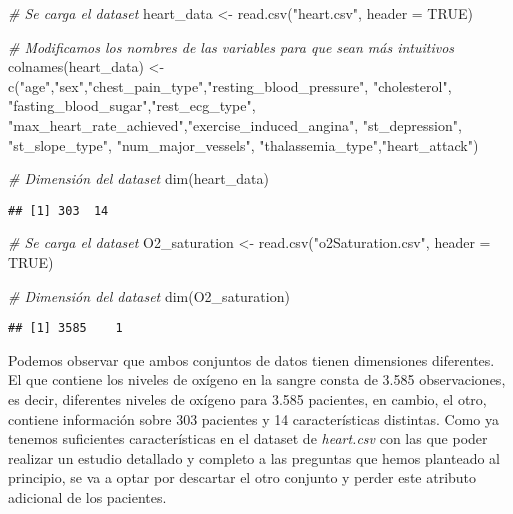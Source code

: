 \documentclass[
]{article}
\newenvironment{Shaded}{\begin{snugshade}}{\end{snugshade}}
\newcommand{\AttributeTok}[1]{\textcolor[rgb]{0.77,0.63,0.00}{#1}}
\newcommand{\CommentTok}[1]{\textcolor[rgb]{0.56,0.35,0.01}{\textit{#1}}}
\newcommand{\ConstantTok}[1]{\textcolor[rgb]{0.00,0.00,0.00}{#1}}
\newcommand{\FunctionTok}[1]{\textcolor[rgb]{0.00,0.00,0.00}{#1}}
\newcommand{\NormalTok}[1]{#1}
\newcommand{\OtherTok}[1]{\textcolor[rgb]{0.56,0.35,0.01}{#1}}
\newcommand{\StringTok}[1]{\textcolor[rgb]{0.31,0.60,0.02}{#1}}
\begin{document}
\begin{Shaded}
\begin{Highlighting}[]
\CommentTok{\# Se carga el dataset}
\NormalTok{heart\_data }\OtherTok{\textless{}{-}} \FunctionTok{read.csv}\NormalTok{(}\StringTok{"heart.csv"}\NormalTok{, }\AttributeTok{header =} \ConstantTok{TRUE}\NormalTok{)}

\CommentTok{\# Modificamos los nombres de las variables para que sean más intuitivos}
\FunctionTok{colnames}\NormalTok{(heart\_data) }\OtherTok{\textless{}{-}} \FunctionTok{c}\NormalTok{(}\StringTok{"age"}\NormalTok{,}\StringTok{"sex"}\NormalTok{,}\StringTok{"chest\_pain\_type"}\NormalTok{,}\StringTok{"resting\_blood\_pressure"}\NormalTok{,}
                          \StringTok{"cholesterol"}\NormalTok{,    }\StringTok{"fasting\_blood\_sugar"}\NormalTok{,}\StringTok{"rest\_ecg\_type"}\NormalTok{,  }
                          \StringTok{"max\_heart\_rate\_achieved"}\NormalTok{,}\StringTok{"exercise\_induced\_angina"}\NormalTok{, }
                          \StringTok{"st\_depression"}\NormalTok{, }\StringTok{"st\_slope\_type"}\NormalTok{, }\StringTok{"num\_major\_vessels"}\NormalTok{,}
                          \StringTok{"thalassemia\_type"}\NormalTok{,}\StringTok{"heart\_attack"}\NormalTok{)}

\CommentTok{\# Dimensión del dataset}
\FunctionTok{dim}\NormalTok{(heart\_data)}
\end{Highlighting}
\end{Shaded}

\begin{verbatim}
## [1] 303  14
\end{verbatim}

\begin{Shaded}
\begin{Highlighting}[]
\CommentTok{\# Se carga el dataset}
\NormalTok{O2\_saturation }\OtherTok{\textless{}{-}} \FunctionTok{read.csv}\NormalTok{(}\StringTok{"o2Saturation.csv"}\NormalTok{, }\AttributeTok{header =} \ConstantTok{TRUE}\NormalTok{)}

\CommentTok{\# Dimensión del dataset}
\FunctionTok{dim}\NormalTok{(O2\_saturation)}
\end{Highlighting}
\end{Shaded}

\begin{verbatim}
## [1] 3585    1
\end{verbatim}

Podemos observar que ambos conjuntos de datos tienen dimensiones
diferentes. El que contiene los niveles de oxígeno en la sangre consta
de 3.585 observaciones, es decir, diferentes niveles de oxígeno para
3.585 pacientes, en cambio, el otro, contiene información sobre 303
pacientes y 14 características distintas. Como ya tenemos suficientes
características en el dataset de \emph{heart.csv} con las que poder
realizar un estudio detallado y completo a las preguntas que hemos
planteado al principio, se va a optar por descartar el otro conjunto y
perder este atributo adicional de los pacientes.
\end{document}
